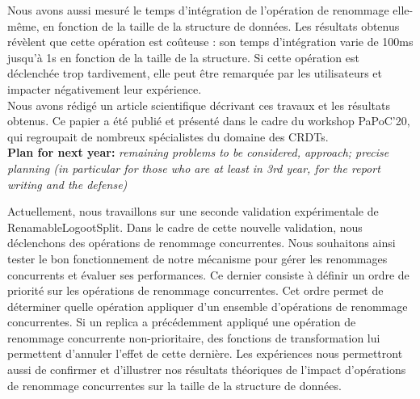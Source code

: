 \documentclass[12pt]{article}
\newcommand{\commentaire}[1]{\small\textit{#1}}
\begin{document}
Nous avons aussi mesuré le temps d'intégration de l'opération de renommage elle-même, en fonction de la taille de la structure de données.
Les résultats obtenus révèlent que cette opération est coûteuse : son temps d'intégration varie de 100ms jusqu'à 1s en fonction de la taille de la structure.
Si cette opération est déclenchée trop tardivement, elle peut être remarquée par les utilisateurs et impacter négativement leur expérience.
\\

Nous avons rédigé un article scientifique décrivant ces travaux et les résultats obtenus. Ce papier a été publié et présenté dans le cadre du workshop PaPoC'20, qui regroupait de nombreux spécialistes du domaine des \acp{CRDT}.
\\

\noindent\textbf{Plan for next year:}
\commentaire{%
  remaining problems to be considered, approach; precise planning (in
  particular for those who are at least in 3rd year, for the report
  writing and the defense)\\}


Actuellement, nous travaillons sur une seconde validation expérimentale de RenamableLogootSplit.
Dans le cadre de cette nouvelle validation, nous déclenchons des opérations de renommage concurrentes.
Nous souhaitons ainsi tester le bon fonctionnement de notre mécanisme pour gérer les renommages concurrents et évaluer ses performances.
Ce dernier consiste à définir un ordre de priorité sur les opérations de renommage concurrentes.
Cet ordre permet de déterminer quelle opération appliquer d'un ensemble d'opérations de renommage concurrentes.
Si un replica a précédemment appliqué une opération de renommage concurrente non-prioritaire, des fonctions de transformation lui permettent d'annuler l'effet de cette dernière.
Les expériences nous permettront aussi de confirmer et d'illustrer nos résultats théoriques de l'impact d'opérations de renommage concurrentes sur la taille de la structure de données.
\\
\end{document}
